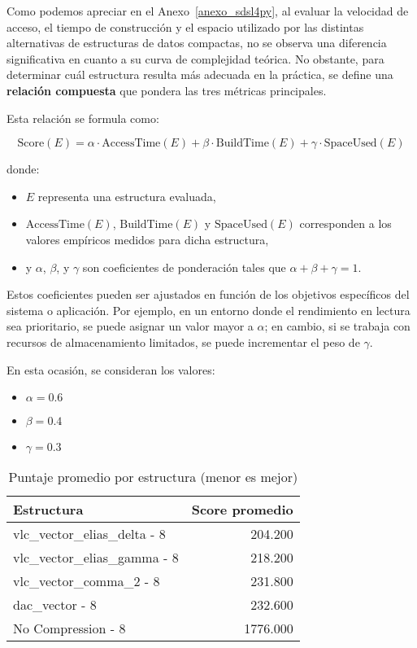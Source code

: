 Como podemos apreciar en el Anexo~\ref{anexo_sdsl4py}, al evaluar la velocidad de acceso, el tiempo de construcción y el espacio utilizado por las distintas alternativas de estructuras de datos compactas, no se observa una diferencia significativa en cuanto a su curva de complejidad teórica. No obstante, para determinar cuál estructura resulta más adecuada en la práctica, se define una \textbf{relación compuesta} que pondera las tres métricas principales.

Esta relación se formula como:

\begin{equation}
\text{Score}(E) = \alpha \cdot \text{AccessTime}(E) + \beta \cdot \text{BuildTime}(E) + \gamma \cdot \text{SpaceUsed}(E)
\end{equation}

donde:
\begin{itemize}
    \item $E$ representa una estructura evaluada,
    \item $\text{AccessTime}(E)$, $\text{BuildTime}(E)$ y $\text{SpaceUsed}(E)$ corresponden a los valores empíricos medidos para dicha estructura,
    \item y $\alpha$, $\beta$, y $\gamma$ son coeficientes de ponderación tales que $\alpha + \beta + \gamma = 1$.
\end{itemize}

Estos coeficientes pueden ser ajustados en función de los objetivos específicos del sistema o aplicación. Por ejemplo, en un entorno donde el rendimiento en lectura sea prioritario, se puede asignar un valor mayor a $\alpha$; en cambio, si se trabaja con recursos de almacenamiento limitados, se puede incrementar el peso de $\gamma$. 

En esta ocasión, se consideran los valores:

\begin{itemize}
    \item $\alpha = 0.6$
	\item $\beta = 0.4$
	\item $\gamma = 0.3$
\end{itemize}

\begin{table}[H]
\centering
\caption{Puntaje promedio por estructura (menor es mejor)}
\label{tab:score_promedio_estructuras}
\begin{tabular}{l r}
\toprule
\textbf{Estructura} & \textbf{Score promedio} \\
\midrule
vlc\_vector\_elias\_delta - 8 & 204.200 \\
vlc\_vector\_elias\_gamma - 8 & 218.200 \\
vlc\_vector\_comma\_2 - 8     & 231.800 \\
dac\_vector - 8              & 232.600 \\
No Compression - 8           & 1776.000 \\
\bottomrule
\end{tabular}
\end{table}

